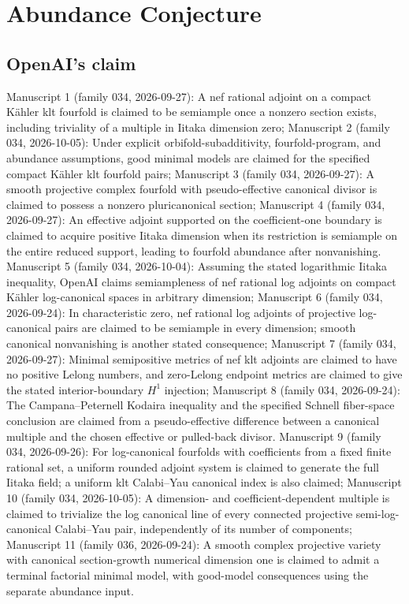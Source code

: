 \documentclass[11pt]{article}
\begin{document}
\section*{Abundance Conjecture}

\subsection{OpenAI's claim}
Manuscript 1 (family 034, 2026-09-27): A nef rational adjoint on a compact Kähler klt fourfold is claimed to be semiample once a nonzero section exists, including triviality of a multiple in Iitaka dimension zero; Manuscript 2 (family 034, 2026-10-05): Under explicit orbifold-subadditivity, fourfold-program, and abundance assumptions, good minimal models are claimed for the specified compact Kähler klt fourfold pairs; Manuscript 3 (family 034, 2026-09-27): A smooth projective complex fourfold with pseudo-effective canonical divisor is claimed to possess a nonzero pluricanonical section; Manuscript 4 (family 034, 2026-09-27): An effective adjoint supported on the coefficient-one boundary is claimed to acquire positive Iitaka dimension when its restriction is semiample on the entire reduced support, leading to fourfold abundance after nonvanishing. Manuscript 5 (family 034, 2026-10-04): Assuming the stated logarithmic Iitaka inequality, OpenAI claims semiampleness of nef rational log adjoints on compact Kähler log-canonical spaces in arbitrary dimension; Manuscript 6 (family 034, 2026-09-24): In characteristic zero, nef rational log adjoints of projective log-canonical pairs are claimed to be semiample in every dimension; smooth canonical nonvanishing is another stated consequence; Manuscript 7 (family 034, 2026-09-27): Minimal semipositive metrics of nef klt adjoints are claimed to have no positive Lelong numbers, and zero-Lelong endpoint metrics are claimed to give the stated interior-boundary $H^1$ injection; Manuscript 8 (family 034, 2026-09-24): The Campana--Peternell Kodaira inequality and the specified Schnell fiber-space conclusion are claimed from a pseudo-effective difference between a canonical multiple and the chosen effective or pulled-back divisor. Manuscript 9 (family 034, 2026-09-26): For log-canonical fourfolds with coefficients from a fixed finite rational set, a uniform rounded adjoint system is claimed to generate the full Iitaka field; a uniform klt Calabi--Yau canonical index is also claimed; Manuscript 10 (family 034, 2026-10-05): A dimension- and coefficient-dependent multiple is claimed to trivialize the log canonical line of every connected projective semi-log-canonical Calabi--Yau pair, independently of its number of components; Manuscript 11 (family 036, 2026-09-24): A smooth complex projective variety with canonical section-growth numerical dimension one is claimed to admit a terminal factorial minimal model, with good-model consequences using the separate abundance input.
\end{document}
